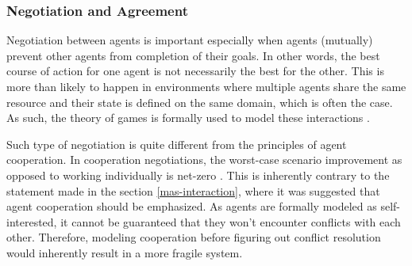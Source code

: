 \documentclass[0main.tex]{subfiles}
\begin{document}

\subsubsection{Negotiation and Agreement}

Negotiation between agents is important especially when agents (mutually) prevent other agents from completion of their goals.
In other words, 
the best course of action for one agent is not necessarily the best for the other. This is more than
likely to happen in environments where multiple agents share the same resource and their state
is defined on the same domain, which is often the case. As such, the theory of games is formally 
used to model these interactions \cite{Binder2022}. 

Such type of negotiation is quite different from the principles of agent cooperation. In
cooperation negotiations, the worst-case scenario improvement as opposed to working
individually is net-zero \cite{Binder2022}.  This is inherently contrary to the statement made
in the section \ref{mas-interaction}, where it was suggested that agent cooperation should be
emphasized. As agents are formally modeled as self-interested, it cannot be guaranteed that
they won't encounter conflicts with each other. Therefore, modeling cooperation before figuring
out conflict resolution would inherently result in a more fragile system. 
\end{document}
